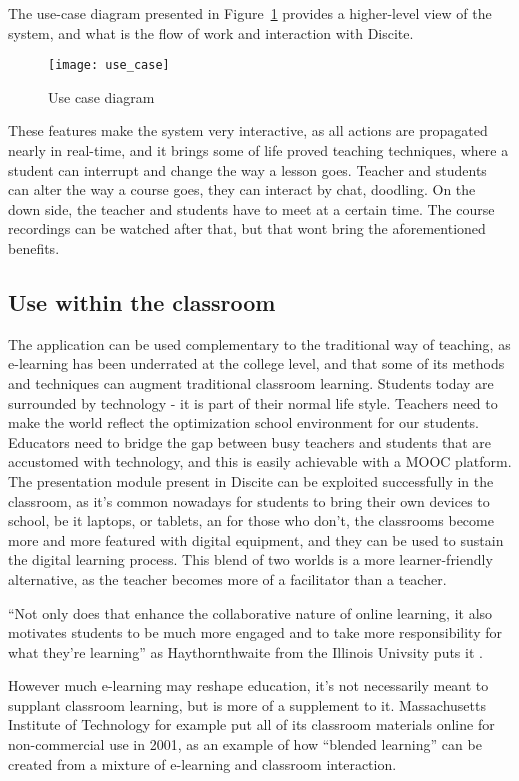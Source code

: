 The use-case diagram presented in Figure~\ref{fig:use_case} provides a higher-level view of the system,
and what is the flow of work and interaction with Discite.
\begin{figure}[ht!]
    \centering
    \texttt{[image: use\_case]}
    \caption{Use case diagram}
    \label{fig:use_case}
\end{figure}
These features make the system very interactive, as all actions are propagated
nearly in real-time, and it brings some of life proved teaching techniques,
where a student can interrupt and change the way a lesson goes.  Teacher and
students can alter the way a course goes, they can interact by chat,
doodling.  On the down side, the teacher and students have to meet at a
certain time. The course recordings can be watched after that, but that wont
bring the aforementioned benefits.
\subsection{Use within the classroom}
The application can be used complementary to
the traditional way of teaching, as e-learning has been underrated at the
college level, and that some of its methods and techniques can augment
traditional classroom learning.  Students today are surrounded by technology -
it is part of their normal life style. Teachers need to make the world reflect
the optimization school environment for our students. Educators need to bridge
the gap between busy teachers and students that are accustomed with technology,
and this is easily achievable with a MOOC platform.  The presentation module
present in Discite can be exploited successfully in the classroom, as it's
common nowadays for students to bring their own devices to school, be it
laptops, or tablets, an for those who don't, the classrooms become more and more
featured with digital equipment, and they can be used to sustain the digital
learning process.  This blend of two worlds is a more learner-friendly
alternative, as the teacher becomes more of a facilitator than a teacher.

“Not only does that enhance the collaborative nature of online learning, it also
motivates students to be much more engaged and to take more responsibility for
what they’re learning” as Haythornthwaite from the Illinois Univsity puts it
\citep{haythornthwaite}.

However much e-learning may reshape education, it’s not necessarily meant to
supplant classroom learning, but is more of a supplement to it.
Massachusetts Institute of Technology for example put all of its classroom
materials online for non-commercial use in 2001, as an example of how “blended
learning” can be created from a mixture of e-learning and classroom interaction.


